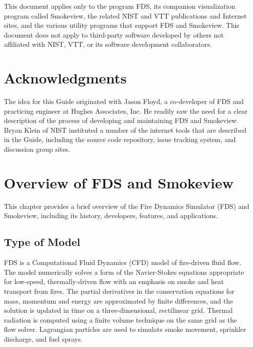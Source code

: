 \documentclass[11pt]{book}
\begin{document}
This document applies only to the program FDS, its companion visualization program called Smokeview,  the related NIST and VTT publications and Internet
sites, and the various utility programs that support FDS and Smokeview. This document does not apply to third-party software developed by others
not affiliated with NIST, VTT, or its software development collaborators.



\chapter{Acknowledgments}

\label{acksection}

The idea for this Guide originated with Jason Floyd, a co-developer of FDS and practicing engineer at Hughes Associates, Inc. He readily saw the need
for a clear description of the process of developing and maintaining FDS and Smokeview. Bryan Klein of NIST instituted a number of the internet tools that
are described in the Guide, including the source code repository, issue tracking system, and discussion group sites.


\newpage

\tableofcontents

\mainmatter


\chapter{Overview of FDS and Smokeview}

This chapter provides a brief overview of the Fire Dynamics Simulator (FDS) and Smokeview, including its history, developers, features, and applications.


\section{Type of Model}

FDS is a Computational Fluid Dynamics (CFD) model of fire-driven fluid flow. The model numerically solves a form of the Navier-Stokes equations
appropriate for low-speed, thermally-driven flow with an emphasis on smoke and heat transport from fires. The partial derivatives in the conservation
equations for mass, momentum and energy are approximated by finite differences, and the solution is updated in time on a three-dimensional,
rectilinear grid. Thermal radiation is computed using a finite volume technique on the same grid as the flow solver. Lagrangian particles are used to
simulate smoke movement, sprinkler discharge, and fuel sprays.
\end{document}
